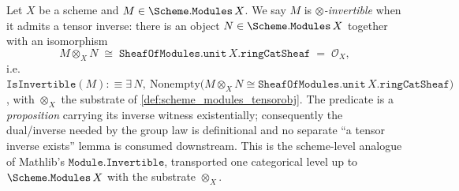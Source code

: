 \begin{definition}
  Let \(X\) be a scheme and \(M \in \Scheme.\mathtt{Modules}\,X\). We say \(M\)
  is \emph{\(\otimes\)-invertible} when it admits a tensor inverse: there is an
  object \(N \in \Scheme.\mathtt{Modules}\,X\) together with an isomorphism
  \[
    M \otimes_X N \;\cong\;
      \mathtt{SheafOfModules.unit}\,X.\mathtt{ringCatSheaf}
      \;=\; \mathcal{O}_X ,
  \]
  i.e.\ \(\mathtt{IsInvertible}(M) :\equiv \exists\, N,\
  \mathrm{Nonempty}\bigl(M \otimes_X N \cong
  \mathtt{SheafOfModules.unit}\,X.\mathtt{ringCatSheaf}\bigr)\), with
  \(\otimes_X\) the substrate of \cref{def:scheme_modules_tensorobj}. The
  predicate is a \emph{proposition} carrying its inverse witness existentially;
  consequently the dual/inverse needed by the group law is definitional and no
  separate ``a tensor inverse exists'' lemma is consumed downstream. This is the
  scheme-level analogue of Mathlib's \(\mathtt{Module.Invertible}\), transported
  one categorical level up to \(\Scheme.\mathtt{Modules}\,X\) with the substrate
  \(\otimes_X\).
\end{definition}

